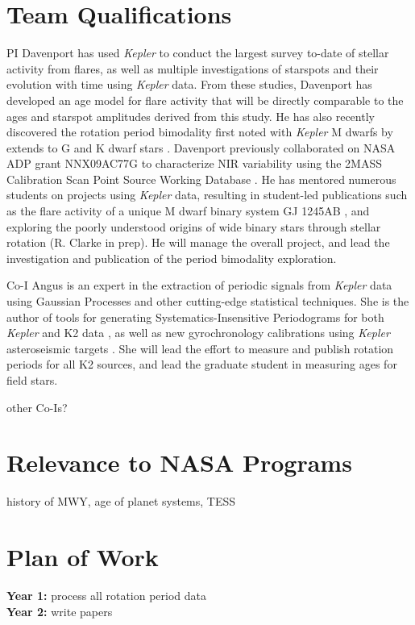 \documentclass[12pt]{article}
\newcommand{\Kepler}{\textsl{Kepler}\xspace}
\begin{document}
\section{Team Qualifications}
PI Davenport has used \Kepler to conduct the largest survey to-date of stellar activity from flares, as well as multiple investigations of starspots and their evolution with time using \Kepler data. From these studies, Davenport has developed an age model for flare activity that will be directly comparable to the ages and starspot amplitudes derived from this study. He has also recently discovered the rotation period bimodality first noted with \Kepler M dwarfs by \citet{mcquillan2013} extends to G and K dwarf stars \citep{davenport2017}.
Davenport previously collaborated on NASA ADP grant NNX09AC77G to characterize NIR variability using the 2MASS Calibration Scan Point Source Working Database \citep{davenport2012,davenport2015a}.
He has mentored numerous students on projects using \Kepler data, resulting in student-led publications such as the flare activity of a unique M dwarf binary system GJ 1245AB \citep{lurie2015}, and exploring the poorly understood origins of wide binary stars through stellar rotation (R. Clarke in prep). He will manage the overall project, and lead the investigation and publication of the period bimodality exploration. 

Co-I Angus is an expert in the extraction of periodic signals from \Kepler data using Gaussian Processes \citep{angus2016c} and other cutting-edge statistical techniques. She is the author of tools for generating Systematics-Insensitive Periodograms for both \Kepler and K2 data \citep{angus2016}, as well as new gyrochronology calibrations using \Kepler asteroseismic targets \citep{angus2015}. She will lead the effort to measure and publish rotation periods for all K2 sources, and lead the graduate student in measuring ages for field stars.

other Co-Is?

\section{Relevance to NASA Programs}
history of MWY, age of planet systems, TESS



\section{Plan of Work}
{\bf Year 1:} process all rotation period data
\\
{\bf Year 2:} write papers 



\clearpage


\end{document}

